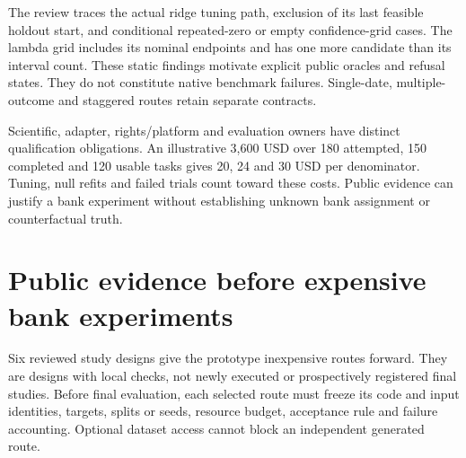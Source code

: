 The review traces the actual ridge tuning path, exclusion of its last
feasible holdout start, and conditional repeated-zero or empty
confidence-grid cases. The lambda grid includes its nominal endpoints
and has one more candidate than its interval count. These static
findings motivate explicit public oracles and refusal states. They do
not constitute native benchmark failures. Single-date, multiple-outcome
and staggered routes retain separate contracts.
\citep{exec24_augsynth_source}

Scientific, adapter, rights/platform and evaluation owners have distinct
qualification obligations. An illustrative 3,600 USD over 180 attempted,
150 completed and 120 usable tasks gives 20, 24 and 30 USD per
denominator. Tuning, null refits and failed trials count toward these
costs. Public evidence can justify a bank experiment without
establishing unknown bank assignment or counterfactual truth.
\citep{exec24_augsynth_choice}

\hypertarget{public-evidence-before-expensive-bank-experiments}{%
\section{Public evidence before expensive bank
experiments}\label{public-evidence-before-expensive-bank-experiments}}

Six reviewed study designs give the prototype inexpensive routes
forward. They are designs with local checks, not newly executed or
prospectively registered final studies. Before final evaluation, each
selected route must freeze its code and input identities, targets,
splits or seeds, resource budget, acceptance rule and failure
accounting. Optional dataset access cannot block an independent
generated route. \citep{sp13_public}

